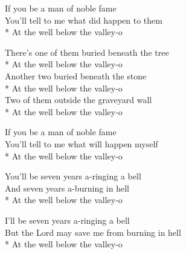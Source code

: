 \versemark
If you be a man of noble fame\\
You’ll tell to me what did happen to them\\*
\vin At the well below the valley-o 

\versemark
There’s one of them buried beneath the tree\\*
\vin At the well below the valley-o\\
Another two buried beneath the stone\\*
\vin At the well below the valley-o\\
Two of them outside the graveyard wall\\*
\vin At the well below the valley-o 

\versemark
If you be a man of noble fame\\
You’ll tell to me what will happen myself\\*
\vin At the well below the valley-o 

\versemark
You’ll be seven years a-ringing a bell\\
And seven years a-burning in hell\\*
\vin At the well below the valley-o 

\versemark
I’ll be seven years a-ringing a bell\\
But the Lord may save me from burning in hell\\*
\vin At the well below the valley-o\doublerefrain

